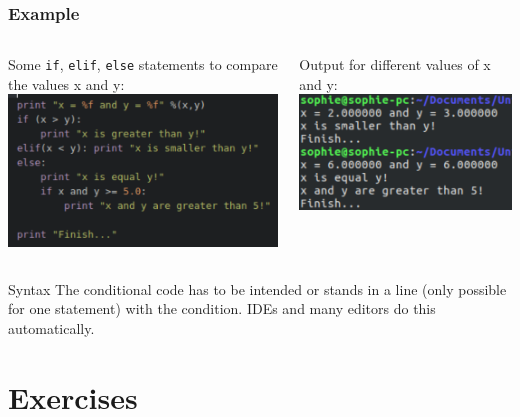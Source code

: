 \documentclass{beamer}
\begin{document}
\begin{frame}
\frametitle{Example}
	\begin{columns}[T]
		\begin{column}[T]{0.6\textwidth}
			Some \texttt{if}, \texttt{elif}, \texttt{else} statements to compare the values x and y:\\
			\includegraphics[width = 1\textwidth]{Comparison.pdf}
		\end{column}
		\begin{column}[T]{0.4\textwidth}
			Output for different values of x and y:\\
			\includegraphics[width = 1\textwidth]{OutputComparison.pdf}	
		\end{column}	
	\end{columns}
	\begin{alertblock} {Syntax} 
		The conditional code has to be intended or stands in a line (only possible for one statement) with the condition. IDEs and many editors do this automatically.
	\end{alertblock}
\end{frame}


\section{Exercises}
\end{document}
